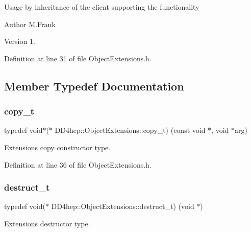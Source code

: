 Usage by inheritance of the client supporting the functionality

\begin{DoxyAuthor}{Author}
M.\+Frank 
\end{DoxyAuthor}
\begin{DoxyVersion}{Version}
1. 
\end{DoxyVersion}


Definition at line 31 of file Object\+Extensions.\+h.



\subsection{Member Typedef Documentation}
\hypertarget{class_d_d4hep_1_1_object_extensions_afb8207da7e2d6d5e3018cc7b5c997f6d}{}\label{class_d_d4hep_1_1_object_extensions_afb8207da7e2d6d5e3018cc7b5c997f6d} 
\subsubsection{\texorpdfstring{copy\+\_\+t}{copy\_t}}
{\footnotesize\ttfamily typedef void$\ast$($\ast$ D\+D4hep\+::\+Object\+Extensions\+::copy\+\_\+t) (const void $\ast$, void $\ast$arg)}



Extensions copy constructor type. 



Definition at line 36 of file Object\+Extensions.\+h.

\hypertarget{class_d_d4hep_1_1_object_extensions_a705a3524f9097577069a83993a39a9b2}{}\label{class_d_d4hep_1_1_object_extensions_a705a3524f9097577069a83993a39a9b2} 
\subsubsection{\texorpdfstring{destruct\+\_\+t}{destruct\_t}}
{\footnotesize\ttfamily typedef void($\ast$ D\+D4hep\+::\+Object\+Extensions\+::destruct\+\_\+t) (void $\ast$)}



Extensions destructor type. 




